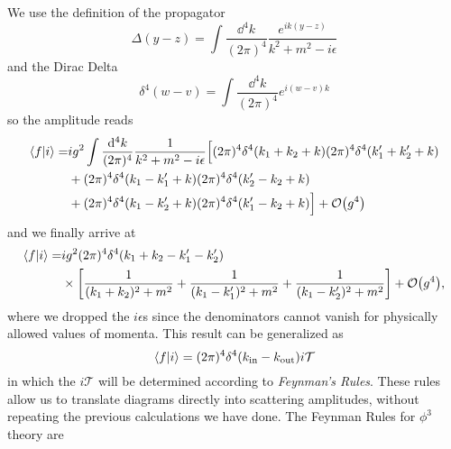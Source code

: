 We use the definition of the propagator
\begin{equation}
    \Delta(y-z)=\int\frac{\dd ^4 k}{(2\pi)^4}\frac{e^{ik(y-z)}}{k^2+m^2-i\epsilon}
\end{equation}
and the Dirac Delta 
\begin{equation}
    \delta^4(w-v)=\int\frac{\dd^4 k}{(2\pi)^4}e^{i(w-v)k}
\end{equation}
so the amplitude reads
\begin{equation}
\begin{aligned}
   \braket{f}{i}=&ig^2\int\frac{\dd^4 k}{(2\pi)^4}\frac{1}{k^2+m^2-i\epsilon}\Big{[}(2\pi)^4\delta^4(k_1+k_2+k)(2\pi)^4\delta^4(k_1^\prime+k_2^\prime+k)\\
   &+(2\pi)^4\delta^4(k_1-k_1^\prime+k)(2\pi)^4\delta^4(k_2^\prime-k_2+k)\\&+(2\pi)^4\delta^4(k_1-k_2^\prime+k)(2\pi)^4\delta^4(k_1^\prime-k_2+k)\Big{]}+\order{g^4}
\end{aligned}
\end{equation}
and we finally arrive at
\begin{equation}
\begin{aligned}
    \braket{f}{i}=&ig^2(2\pi)^4\delta^4(k_1+k_2-k_1^\prime-k_2^\prime)\\
    &\times\qty[\frac{1}{(k_1+k_2)^2+m^2}+\frac{1}{(k_1-k_1^\prime)^2+m^2}+\frac{1}{(k_1-k_2^\prime)^2+m^2}]+\order{g^4}
    \label{fi_final},
\end{aligned}
\end{equation}
where we dropped the $i\epsilon$s since the denominators cannot vanish for physically allowed values of momenta. This result can be generalized as
\begin{equation}
    \braket{f}{i}=(2\pi)^4\delta^4(k_{\text{in}}-k_{\text{out}})i\mathcal{T}
    \label{scattering_amplitude}
\end{equation}
in which the $i\mathcal{T}$ will be determined according to \textit{Feynman's Rules}. These rules allow us to translate diagrams directly into scattering amplitudes, without repeating  the previous calculations we have done.
The Feynman Rules for $\phi^3$ theory are
